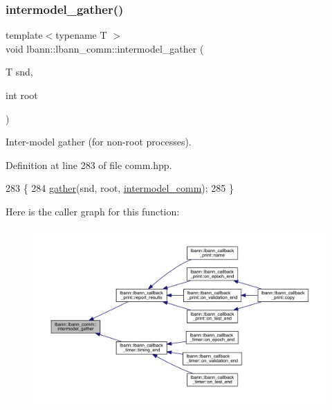\subsubsection{\texorpdfstring{intermodel\+\_\+gather()}{intermodel\_gather()}\hspace{0.1cm}{\footnotesize\ttfamily [1/4]}}
{\footnotesize\ttfamily template$<$typename T $>$ \\
void lbann\+::lbann\+\_\+comm\+::intermodel\+\_\+gather (\begin{DoxyParamCaption}\item[{T}]{snd,  }\item[{int}]{root }\end{DoxyParamCaption})\hspace{0.3cm}{\ttfamily [inline]}}

Inter-\/model gather (for non-\/root processes). 

Definition at line 283 of file comm.\+hpp.


\begin{DoxyCode}
283                                           \{
284     \hyperlink{classlbann_1_1lbann__comm_aa784298e6ed0f9f01a20b179d5110df9}{gather}(snd, root, \hyperlink{classlbann_1_1lbann__comm_a2c51c5d8faf4f0ab4f43b892c55e597b}{intermodel\_comm});
285   \}
\end{DoxyCode}
Here is the caller graph for this function\+:\nopagebreak
\begin{figure}[H]
\begin{center}
\leavevmode
\includegraphics[width=350pt]{classlbann_1_1lbann__comm_a142c396a4d4a2c16ee234b813e7e45a6_icgraph}
\end{center}
\end{figure}
\mbox{\label{classlbann_1_1lbann__comm_aafaadde82ce60f467b5dcf014dc78481}} 
